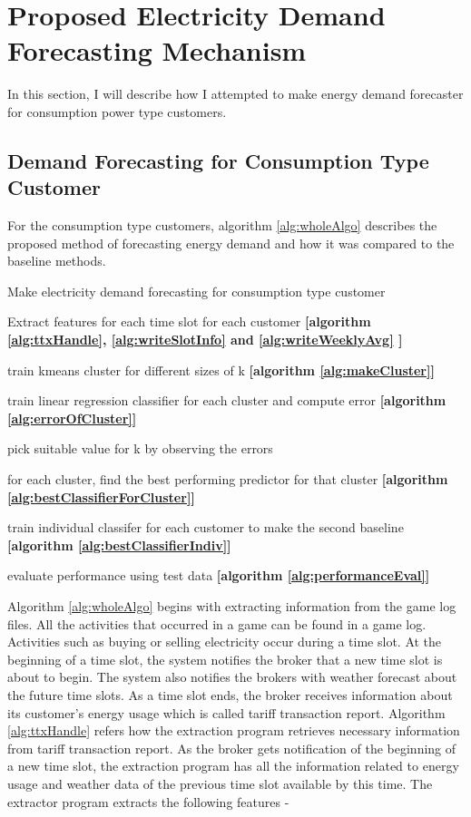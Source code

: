 \section{Proposed Electricity Demand Forecasting Mechanism}

In this section, I will describe how I attempted to make energy demand forecaster for consumption power type customers.

\subsection{Demand Forecasting for Consumption Type Customer}
For the consumption type customers, algorithm \ref{alg:wholeAlgo} describes the proposed method of forecasting energy demand and how it was compared to the baseline methods. 


\begin{algorithm}
\caption{Make electricity demand forecasting for consumption type customer}
\begin{algorithmic}[1]
\STATE Extract features for each time slot for each customer \textbf{[algorithm \ref{alg:ttxHandle}, \ref{alg:writeSlotInfo} and \ref{alg:writeWeeklyAvg} ] }

\STATE train kmeans cluster for different sizes of k \textbf{[algorithm \ref{alg:makeCluster}]} 

\STATE train linear regression classifier for each cluster and compute error \textbf{[algorithm \ref{alg:errorOfCluster}]}

\STATE pick suitable value for k by observing the errors
 
\STATE for each cluster, find the best performing predictor for that cluster \textbf{[algorithm \ref{alg:bestClassifierForCluster}]} 

\STATE train individual classifer for each customer to make the second baseline \textbf{[algorithm \ref{alg:bestClassifierIndiv}]}

\STATE evaluate performance using test data \textbf{[algorithm \ref{alg:performanceEval}]}  
\end{algorithmic}
\label{alg:wholeAlgo}
\end{algorithm}

Algorithm \ref{alg:wholeAlgo} begins with extracting information from the game log files. All the activities that occurred in a game can be found in a game log.  Activities such as buying or selling electricity occur during a time slot. At the beginning of a time slot, the system notifies the broker that a new time slot is about to begin. The system also notifies the brokers with weather forecast about the future time slots. As a time slot ends, the broker receives information about its customer's energy usage which is called tariff transaction report. Algorithm \ref{alg:ttxHandle} refers how the extraction program retrieves necessary information from tariff transaction report. As the broker gets notification of the beginning of a new time slot, the extraction program has all the information related to energy usage and weather data of the previous time slot available by this time. The extractor program extracts the following features -
 
